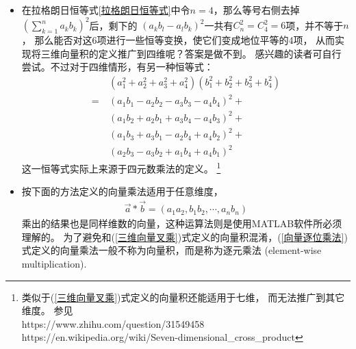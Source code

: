\begin{itemize}[leftmargin=\inteval{\myitemleftmargin}pt,itemsep=
   \inteval{\myitemitempsep}pt,topsep=\inteval{\myitemtopsep}pt]
\item 在拉格朗日恒等式\eqref{拉格朗日恒等式}中令$ n=4 $，那么等号右侧去掉
$ \left( \sum\limits_{k=1}^{n}a_kb_k\right)^2 $后，剩下的
$ \left( a_kb_l-a_lb_k\right)^2 $一共有$ C_n^2=C_4^2=6 $项，并不等于$ n $，
那么能否对这6项进行一些恒等变换，使它们变成地位平等的4项，
从而实现将三维向量积的定义推广到四维呢？答案是做不到。
感兴趣的读者可自行尝试。不过对于四维情形，有另一种恒等式：
\begin{align*}
    &(a_1^2+a_2^2+a_3^2+a_4^2)(b_1^2+b_2^2+b_3^2+b_4^2) \\
    =\ &(a_1b_1-a_2b_2-a_3b_3-a_4b_4)^2+\\
    &(a_1b_2+a_2b_1+a_3b_4-a_4b_3)^2+\\
    &(a_1b_3+a_3b_1-a_2b_4+a_4b_2)^2+\\
    &(a_2b_3-a_3b_2+a_1b_4+a_4b_1)^2
\end{align*}
这一恒等式实际上来源于四元数乘法的定义。
\footnote{ 类似于(\ref{三维向量叉乘})式定义的向量积还能适用于七维，
    而无法推广到其它维度。
参见 \\
https://www.zhihu.com/question/31549458   \\
https://en.wikipedia.org/wiki/Seven-dimensional\_{}cross\_{}product 
%
%
}

\item 按下面的方法定义的向量乘法适用于任意维度，
\begin{gather}\label{向量逐位乘法}
    \vec{a}*\vec{b}=(a_1a_2,b_1b_2,\cdots,a_nb_n)
\end{gather}
乘出的结果也是同样维数的向量，这种运算法则是使用MATLAB软件所必须理解的。
为了避免和(\ref{三维向量叉乘})式定义的向量积混淆，(\ref{向量逐位乘法})
式定义的向量乘法一般不称为向量积，而是称为逐元乘法
(element-wise multiplication). 


\end{itemize}

